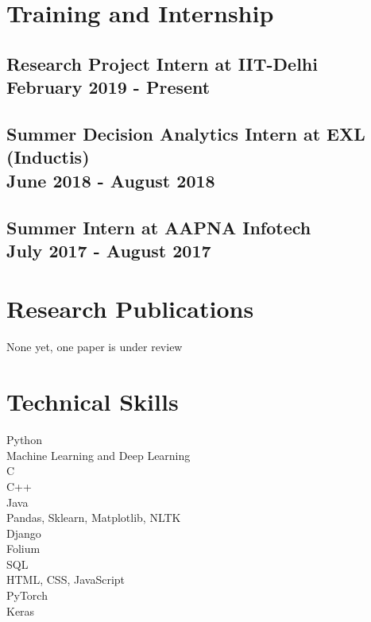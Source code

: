 \documentclass{article}
\begin{document}
\section{Training and Internship}
\subsection{Research Project Intern at IIT-Delhi\\February 2019 - Present}
\subsection{Summer Decision Analytics Intern at EXL (Inductis)\\June 2018 - August 2018}
\subsection{Summer Intern at AAPNA Infotech \\ July 2017 - August 2017}

\section{Research Publications}
None yet, one paper is under review

\section{Technical Skills}
Python
\\ Machine Learning and Deep Learning
\\C
\\C++
\\Java
\\ Pandas, Sklearn, Matplotlib, NLTK
\\ Django
\\ Folium
\\SQL
\\HTML, CSS, JavaScript
\\PyTorch
\\Keras
\end{document}
